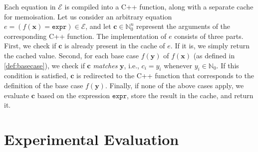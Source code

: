 \documentclass[letterpaper]{article} %
\theoremstyle{remark}
\theoremstyle{definition}
\newcommand{\expr}{\mathtt{expr}}
\begin{document}
Each equation in $\mathcal{E}$ is compiled into a C++ function, along with a
separate cache for memoisation. Let us consider an arbitrary equation
$e = (f(\mathbf{x}) = \expr{}) \in \mathcal{E}$, and let
$\mathbf{c} \in \mathbb{N}_{0}^{n}$ represent the arguments of the corresponding
C++ function. The implementation of $e$ consists of three parts. First, we check
if $\mathbf{c}$ is already present in the cache of $e$. If it is, we simply
return the cached value. Second, for each base case $f(\mathbf{y})$ of
$f(\mathbf{x})$ (as defined in \cref{def:basecase}), we check if $\mathbf{c}$
\emph{matches} $\mathbf{y}$, i.e., $c_{i} = y_{i}$ whenever
$y_{i} \in \mathbb{N}_{0}$. If this condition is satisfied, $\mathbf{c}$ is
redirected to the C++ function that corresponds to the definition of the base
case $f(\mathbf{y})$. Finally, if none of the above cases apply, we evaluate
$\mathbf{c}$ based on the expression $\expr{}$, store the result in the cache,
and return it.

\section{Experimental Evaluation}\label{sec:experiments}





\end{document}
